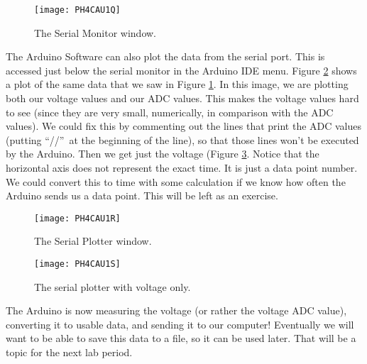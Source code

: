 \begin{figure}[htbp!]
\centering
\texttt{[image: PH4CAU1Q]}
\caption[The Serial Monitor window]{The Serial Monitor window.}
\label{fig:serial_monitor}
\end{figure}

The Arduino Software can also plot the data from the serial port. This is
accessed just below the serial monitor in the Arduino IDE menu.
Figure \ref{fig:serial_plotter} shows a
plot of the same data that we saw in Figure \ref{fig:serial_monitor}. 
In this image, we are plotting both our
voltage values and our ADC values. This makes the voltage
values hard to see (since they are very small, numerically, in comparison
with the ADC values). We could fix this by commenting out the lines that print
the ADC values (putting \textquotedblleft //\textquotedblright\ at the
beginning of the line), so that those lines won't be executed by the Arduino.
Then we get just the voltage (Figure \ref{fig:serial_plotter_2}. 
Notice that the horizontal axis
does not represent the exact time. 
It is just a data point number. We could convert this
to time with some calculation if we know how often the Arduino sends us a
data point. This will be left as an exercise.

\begin{figure}[htbp!]
\centering
\texttt{[image: PH4CAU1R]}
\caption[The Serial Plotter window]{The Serial Plotter window.}
\label{fig:serial_plotter}
\end{figure}

\begin{figure}[htbp!]
\centering
\texttt{[image: PH4CAU1S]}
\caption[The serial plotter with voltage only]{The serial plotter with
voltage only.}
\label{fig:serial_plotter_2}
\end{figure}

The Arduino is now measuring the voltage (or rather the voltage ADC value),
converting it to usable data, and sending it to our computer! Eventually we will
want to be able to save this data to a file, so it can be used later. That will
be a topic for the next lab period.

